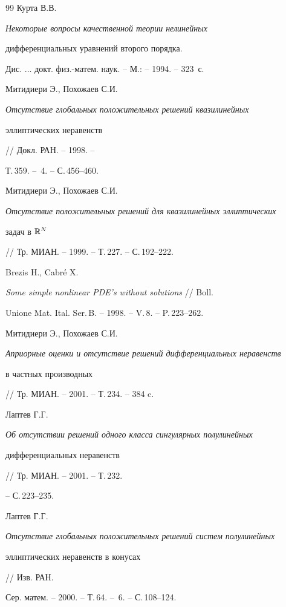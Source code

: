 \begin{thebibliography}{99}
 Курта В.В.


{\em Некоторые вопросы качественной теории нелинейных


дифференциальных уравнений второго порядка.}


Дис. $\dotsc$ докт. физ.-матем. наук. -- М.: -- 1994. -- 323~с.








 Митидиери Э., Похожаев С.И.


{\em Отсутствие глобальных положительных решений квазилинейных


эллиптических неравенств} // Докл. РАН. -- 1998. -- 


Т.\,359. -- \No\,4. -- С.\,456--460.







Митидиери Э., Похожаев С.И.


{\em Отсутствие положительных решений для квазилинейных эллиптических


задач в $\Bbb{R}^{N}$} // Тр. МИАН. -- 1999. -- Т.\,227. -- С.\,192--222.







Brezis H., Cabr\'e X.


{\em Some simple nonlinear PDE's without solutions} // Boll.


Unione Mat. Ital. Ser.\,B. -- 1998. -- V.\,8. -- P.\,223--262.







Митидиери Э., Похожаев С.И.


{\em Априорные оценки и отсутствие решений дифференциальных неравенств


в частных производных} // Тр. МИАН. -- 2001. -- Т.\,234. -- 384 c.





 Лаптев Г.Г.


{\em Об отсутствии решений одного класса сингулярных полулинейных


дифференциальных неравенств} // Тр. МИАН. -- 2001. -- Т.\,232.


-- С.\,223--235.





 Лаптев Г.Г.


{\em Отсутствие глобальных положительных решений систем полулинейных


эллиптических неравенств в конусах} // Изв. РАН.


Сер. матем. -- 2000. -- Т.\,64. -- \No\,6. -- С.\,108--124.





\end{thebibliography}






